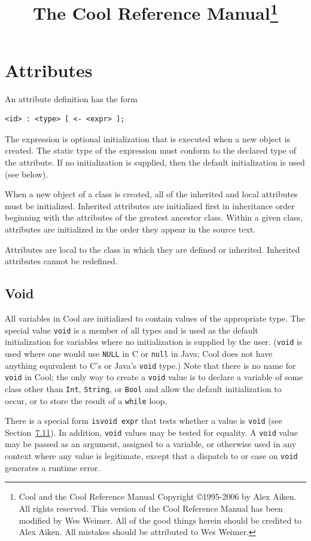\documentclass[]{article}
\title{The Cool Reference Manual\footnote{Cool and the Cool Reference Manual Copyright ©1995-2006 by Alex Aiken. All rights reserved. This version of the Cool Reference Manual has been modified by Wes Weimer. All of the good things herein should be credited to Alex Aiken. All mistakes should be attributed to Wes Weimer.}}
\begin{document}
\maketitle
\tableofcontents

\section{Attributes}

An attribute definition has the form

\begin{verbatim}
<id> : <type> [ <- <expr> ];
\end{verbatim}

The expression is optional initialization that is executed when a new
object is created. The static type of the expression must conform to the
declared type of the attribute. If no initialization is supplied, then
the default initialization is used (see below).

When a new object of a class is created, all of the inherited and local
attributes must be initialized. Inherited attributes are initialized
first in inheritance order beginning with the attributes of the greatest
ancestor class. Within a given class, attributes are initialized in the
order they appear in the source text.

Attributes are local to the class in which they are defined or
inherited. Inherited attributes cannot be redefined.


\subsection{Void}

All variables in Cool are initialized to contain values of the
appropriate type. The special value \texttt{void} is a member of all
types and is used as the default initialization for variables where no
initialization is supplied by the user. (\texttt{void} is used where one
would use \texttt{NULL} in C or \texttt{null} in Java; Cool does not
have anything equivalent to C's or Java's \texttt{void} type.) Note that
there is no name for \texttt{void} in Cool; the only way to create a
\texttt{void} value is to declare a variable of some class other than
\texttt{Int}, \texttt{String}, or \texttt{Bool} and allow the default
initialization to occur, or to store the result of a \texttt{while}
loop.

There is a special form \texttt{isvoid expr} that tests whether a value
is \texttt{void} (see Section~\href{node24.html\#sec-isvoid}{7.11}). In
addition, \texttt{void} values may be tested for equality. A
\texttt{void} value may be passed as an argument, assigned to a
variable, or otherwise used in any context where any value is
legitimate, except that a dispatch to or case on \texttt{void} generates
a runtime error.
\end{document}

